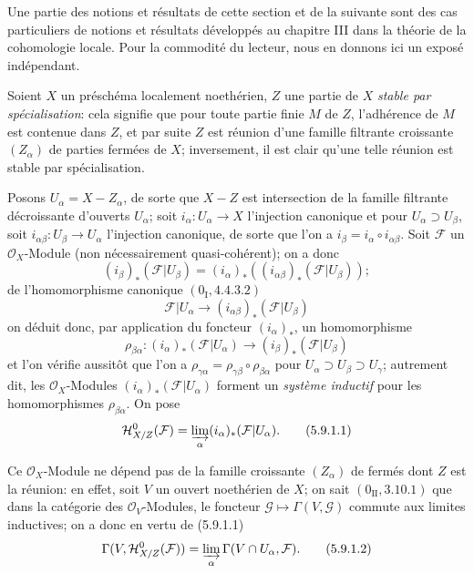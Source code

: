 Une partie des notions et résultats de cette section et de la suivante sont des
cas particuliers de notions et résultats développés au chapitre III dans la
théorie de la cohomologie locale. Pour la commodité du lecteur, nous en donnons
ici un exposé indépendant.

\begin{env}[5.9.1]
\label{IV.2.s5.9.1-fr}
Soient $X$ un préschéma localement noethérien, $Z$ une partie de $X$
\emph{stable par spécialisation}: cela signifie que pour toute partie finie
$M$ de $Z$, l'adhérence de $M$ est contenue dans $Z$, et par suite $Z$ est
réunion d'une famille filtrante croissante $(Z_\alpha)$ de parties fermées de
$X$; inversement, il est clair qu'une telle réunion est stable par
spécialisation.

Posons $U_\alpha=X-Z_\alpha$, de sorte que $X-Z$ est intersection de la
famille filtrante décroissante d'ouverts $U_\alpha$; soit
$i_\alpha:U_\alpha\to X$ l'injection canonique et pour
$U_\alpha\supset U_\beta$, soit $i_{\alpha\beta}:U_\beta\to U_\alpha$
l'injection canonique, de sorte que l'on a
$i_\beta=i_\alpha\circ i_{\alpha\beta}$. Soit $\mathcal F$ un
$\mathcal O_X$-Module (non nécessairement quasi-cohérent); on a donc
\[
(i_\beta)_*(\mathcal F|U_\beta)
=(i_\alpha)_*((i_{\alpha\beta})_*(\mathcal F|U_\beta));
\]
de l'homomorphisme canonique $(0_{\mathrm I},4.4.3.2)$
\[
\mathcal F|U_\alpha\longrightarrow
(i_{\alpha\beta})_*(\mathcal F|U_\beta)
\]
on déduit donc, par application du foncteur $(i_\alpha)_*$, un homomorphisme
\[
\rho_{\beta\alpha}:(i_\alpha)_*(\mathcal F|U_\alpha)
\longrightarrow(i_\beta)_*(\mathcal F|U_\beta)
\]
et l'on vérifie aussitôt que l'on a
$\rho_{\gamma\alpha}=\rho_{\gamma\beta}\circ\rho_{\beta\alpha}$ pour
$U_\alpha\supset U_\beta\supset U_\gamma$; autrement dit, les
$\mathcal O_X$-Modules $(i_\alpha)_*(\mathcal F|U_\alpha)$ forment un
\emph{système inductif} pour les homomorphismes $\rho_{\beta\alpha}$.
On pose
\begin{equation}
\mathcal H^0_{X/Z}(\mathcal F)
=\varinjlim_\alpha(i_\alpha)_*(\mathcal F|U_\alpha).
\tag{5.9.1.1}\label{IV.2.s5.9.1.1-fr}
\end{equation}

Ce $\mathcal O_X$-Module ne dépend pas de la famille croissante
$(Z_\alpha)$ de fermés dont $Z$ est la réunion: en effet, soit $V$ un ouvert
noethérien de $X$; on sait $(0_{\mathrm{II}},3.10.1)$ que dans la catégorie
des $\mathcal O_V$-Modules, le foncteur
$\mathcal G\mapsto\Gamma(V,\mathcal G)$ commute aux limites inductives; on a
donc en vertu de (5.9.1.1)
\begin{equation}
\Gamma(V,\mathcal H^0_{X/Z}(\mathcal F))
=\varinjlim_\alpha\Gamma(V\cap U_\alpha,\mathcal F).
\tag{5.9.1.2}\label{IV.2.s5.9.1.2-fr}
\end{equation}


\end{env}
